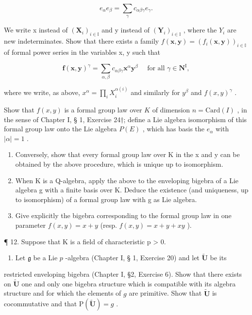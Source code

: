 \[
e _ {\alpha} e _ {\beta} = \sum_ {\gamma} c _ {\alpha \beta \gamma} e _ {\gamma}.
\]

We write x instead of \((\mathbf{X}_{i})_{i\in\mathbb{I}}\) and y instead of \((\mathbf{Y}_{i})_{i\in\mathbb{I}}\) , where the \(Y_{i}\) are new indeterminates. Show that there exists a family \(f(\boldsymbol{x},\boldsymbol{y})=(f_{i}(\boldsymbol{x},\boldsymbol{y}))_{i\in\mathbb{I}}\) of formal power series in the variables x, y such that

\[
\boldsymbol {f} (\boldsymbol {x}, \boldsymbol {y}) ^ {\gamma} = \sum_ {\alpha , \beta} c _ {\alpha \beta \gamma} \boldsymbol {x} ^ {\alpha} \boldsymbol {y} ^ {\beta} \quad \text { for   all } \gamma \in \mathbf {N} ^ {\mathrm{I}},
\]

where we write, as above, \(x^{\alpha} = \prod_{i} X_{i}^{\alpha(i)}\) and similarly for \(y^{\beta}\) and \(f(x, y)^{\gamma}\) .

Show that \(f(x, y)\) is a formal group law over \(K\) of dimension \(n = \text{Card}(I)\) , in the sense of Chapter I, § 1, Exercise 24†; define a Lie algebra isomorphism of this formal group law onto the Lie algebra \(P(E)\) , which has basis the \(e_{\alpha}\) with \(|\alpha| = 1\) .

\begin{enumerate}
\def\labelenumi{(\alph{enumi})}
\setcounter{enumi}{2}
\item
  Conversely, show that every formal group law over K in the x and y can be obtained by the above procedure, which is unique up to isomorphism.
\item
  When K is a Q-algebra, apply the above to the enveloping bigebra of a Lie algebra g with a finite basis over K. Deduce the existence (and uniqueness, up to isomorphism) of a formal group law with g as Lie algebra.
\item
  Give explicitly the bigebra corresponding to the formal group law in one parameter \(f(x, y) = x + y\) (resp. \(f(x, y) = x + y + xy\) ).
\end{enumerate}

¶ 12. Suppose that K is a field of characteristic p > 0.

\begin{enumerate}
\def\labelenumi{(\alph{enumi})}
\tightlist
\item
  Let \(\mathfrak{g}\) be a Lie \(p\) -algebra (Chapter I, § 1, Exercise 20) and let \(\tilde{\mathbf{U}}\) be its
\end{enumerate}


restricted enveloping bigebra (Chapter I, §2, Exercise 6). Show that there exists on \(\tilde{\mathbf{U}}\) one and only one bigebra structure which is compatible with its algebra structure and for which the elements of \(g\) are primitive. Show that \(\tilde{\mathbf{U}}\) is cocommutative and that \(\mathrm{P}(\tilde{\mathbf{U}}) = g\) .

